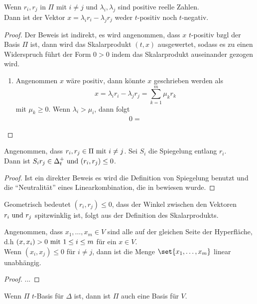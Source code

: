 \begin{proposition}
	Wenn $r_i, r_j$ in $\Pi$ mit $i\neq j$ und $\lambda_i, \lambda_j$ sind positive reelle Zahlen.\\
	Dann ist der Vektor $x = \lambda_i r_i - \lambda_j r_j$ weder $t$-positiv noch $t$-negativ.
\end{proposition}
\begin{proof} Der Beweis ist indirekt, es wird angenommen, dass $x$ $t$-positiv bzgl der Basis $\Pi$ ist, dann wird das Skalarprodukt $(t,x)$ ausgewertet, sodass es zu einen Widerspruch führt der Form $0 > 0$ indem das Skalarprodukt auseinander gezogen wird.
	\begin{enumerate}
		\item Angenommen $x$ wäre positiv, dann könnte $x$ geschrieben werden als
		\[
			x = \lambda_i r_i - \lambda_j r_j = \sum_{k=1}^m \mu_k r_k
		\]
		mit $\mu_k \ge 0$. Wenn $\lambda_i > \mu_i$, dann folgt
		\begin{align*}
			0 = 
		\end{align*}
	\end{enumerate}
\end{proof}
\begin{proposition}
	Angenommen, dass $r_i, r_j \in \Pi \mit i \neq j$. Sei $S_i$ die Spiegelung entlang $r_i$.\\
	Dann ist $S_i r_j \in \Delta_t^+ \und (r_i,r_j) \le 0$.
\end{proposition}
\begin{proof}
	Ist ein direkter Beweis es wird die Definition von Spiegelung benutzt und die ``Neutralität'' eines Linearkombination, die in  bewiesen wurde. 
\end{proof}
\begin{*remark}
	Geometrisch bedeutet $(r_i, r_j) \le 0$, dass der Winkel zwischen den Vektoren $r_i \und r_j$ spitzwinklig ist, folgt aus der Definition des Skalarprodukts.
\end{*remark}
\begin{proposition}
	Angenommen, dass $x_1, \dots, x_m \in V$ sind alle auf der gleichen Seite der Hyperfläche, d.h $(x,x_i) >0 \mit 1\le i \le m$ für ein $x \in V$.\\
	Wenn $(x_i,x_j) \le 0$ für $i\neq j$, dann ist die Menge $\set{x_1,\dots,x_m}$ linear unabhängig. 
\end{proposition}
\begin{proof}
	...
\end{proof}
\begin{theorem}
	Wenn $\Pi$ $t$-Basis für $\Delta$ ist, dann ist $\Pi$ auch eine Basis für $V$.
\end{theorem}
